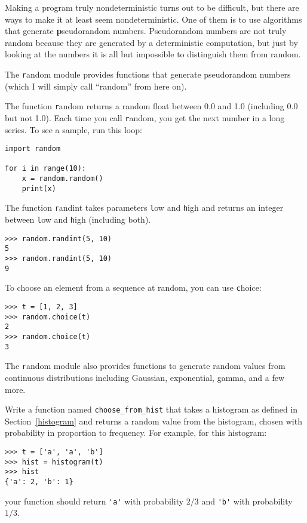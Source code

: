 \documentclass[
DIV=11,
fontsize=13,
twoside,
headinclude=false,
titlepage=firstiscover,
abstract=true,
headsepline=true,
footsepline=true,
chapterprefix=true, %
headings=big,
bibliography=totoc,%
captions=tableheading
]{scrbook}
\theoremstyle{definition}
\begin{document}
Making a program truly nondeterministic turns out to be difficult,
but there are ways to make it at least seem nondeterministic.  One of
them is to use algorithms that generate {\textbf pseudorandom} numbers.
Pseudorandom numbers are not truly random because they are generated
by a deterministic computation, but just by looking at the numbers it
is all but impossible to distinguish them from random.

The {\texttt random} module provides functions that generate
pseudorandom numbers (which I will simply call ``random'' from
here on).

The function {\texttt random} returns a random float
between 0.0 and 1.0 (including 0.0 but not 1.0).  Each time you
call {\texttt random}, you get the next number in a long series.  To see a
sample, run this loop:

\begin{lstlisting}
import random

for i in range(10):
    x = random.random()
    print(x)
\end{lstlisting}
%
The function {\texttt randint} takes parameters {\texttt low} and
{\texttt high} and returns an integer between {\texttt low} and
{\texttt high} (including both).

\begin{lstlisting}
>>> random.randint(5, 10)
5
>>> random.randint(5, 10)
9
\end{lstlisting}
%
To choose an element from a sequence at random, you can use
{\texttt choice}:

\begin{lstlisting}
>>> t = [1, 2, 3]
>>> random.choice(t)
2
>>> random.choice(t)
3
\end{lstlisting}
%
The {\texttt random} module also provides functions to generate
random values from continuous distributions including
Gaussian, exponential, gamma, and a few more.

\begin{exercise}
\normalfont
{}

Write a function named \verb"choose_from_hist" that takes
a histogram as defined in Section~\ref{histogram} and returns a 
random value from the histogram, chosen with probability
in proportion to frequency.  For example, for this histogram:

\begin{lstlisting}
>>> t = ['a', 'a', 'b']
>>> hist = histogram(t)
>>> hist
{'a': 2, 'b': 1}
\end{lstlisting}
%
your function should return \verb"'a'" with probability $2/3$ and \verb"'b'"
with probability $1/3$.
\end{exercise}
\end{document}
